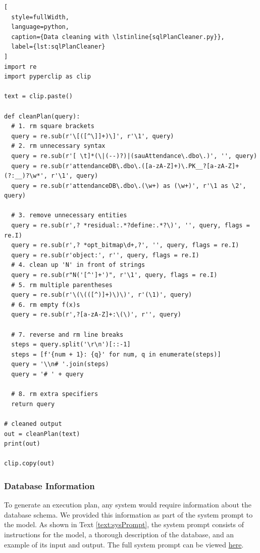 \begin{lstlisting}[
  style=fullWidth,
  language=python,
  caption={Data cleaning with \lstinline{sqlPlanCleaner.py}},
  label={lst:sqlPlanCleaner}
]
import re
import pyperclip as clip

text = clip.paste()

def cleanPlan(query):
  # 1. rm square brackets
  query = re.sub(r'\[([^\]]+)\]', r'\1', query)
  # 2. rm unnecessary syntax
  query = re.sub(r'[ \t]*(\|(--)?)|(sauAttendance\.dbo\.)', '', query)
  query = re.sub(r'attendanceDB\.dbo\.([a-zA-Z]+)\.PK__?[a-zA-Z]+(?:__)?\w*', r'\1', query)
  query = re.sub(r'attendanceDB\.dbo\.(\w+) as (\w+)', r'\1 as \2', query)

  # 3. remove unnecessary entities
  query = re.sub(r',? *residual:.*?define:.*?\)', '', query, flags = re.I)
  query = re.sub(r',? *opt_bitmap\d+,?', '', query, flags = re.I)
  query = re.sub(r'object:', r'', query, flags = re.I)
  # 4. clean up 'N' in front of strings
  query = re.sub(r"N('[^']+')", r'\1', query, flags = re.I)
  # 5. rm multiple parentheses
  query = re.sub(r'\(\(([^)]+)\)\)', r'(\1)', query)
  # 6. rm empty f(x)s
  query = re.sub(r',?[a-zA-Z]+:\(\)', r'', query)
  
  # 7. reverse and rm line breaks
  steps = query.split('\r\n')[::-1]
  steps = [f'{num + 1}: {q}' for num, q in enumerate(steps)]
  query = '\\n# '.join(steps)
  query = '# ' + query

  # 8. rm extra specifiers
  return query

# cleaned output
out = cleanPlan(text)
print(out)

clip.copy(out)
\end{lstlisting}

\subsubsection{Database Information}
To generate an execution plan, any system would require information about the database schema. We provided this information as part of the system prompt to the model. As shown in Text \ref{text:sysPrompt}, the system prompt consists of instructions for the model, a thorough description of the database, and an example of its input and output. The full system prompt can be viewed \href{https://github.com/MatousAc/llamaExecPlan/blob/main/src/sysPrompt.txt}{here}.

